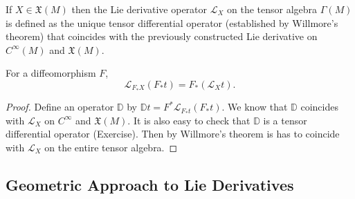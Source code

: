 \documentclass[english,letterpaper]{article}%
\numberwithin{equation}{section}
\numberwithin{figure}{section}
\numberwithin{table}{section}
\theoremstyle{definition}
\theoremstyle{definition}
\theoremstyle{definition}
\theoremstyle{plain}
\theoremstyle{plain}
\theoremstyle{plain}
\theoremstyle{plain}
\theoremstyle{remark}
\theoremstyle{remark}
\def\red{\color{red}}
\newcommand{\Lie}{\mathcal{L}}
\newcommand{\fX}{\mathfrak{X}}
\newcommand{\PRLsep}{   %
           \noindent\makebox[\linewidth]{
                \resizebox{0.5\linewidth}{1pt}{$\blacklozenge$}}}
\begin{document}
\begin{defn}
If $X\in\fX(M)$ then the Lie derivative operator $\Lie_X$ on the tensor algebra $\Gamma(M)$ is defined as the unique tensor differential operator (established by Willmore's theorem) that coincides with the previously constructed Lie derivative on $C^\infty(M)$ and $\fX(M)$.
\end{defn}

\begin{prop}\label{pullbacks of Lie derivatives}
For a diffeomorphism $F$, 
\[\Lie_{F_\ast X}(F_\ast t)=F_\ast (\Lie_X t).\]
\end{prop}
\begin{proof}
Define an operator $\mathbb{D}$ by $\mathbb{D}t=F^\ast \Lie_{F_\ast t}(F_\ast t)$. We know that $\mathbb{D}$ coincides with $\Lie_X$ on $C^\infty$ and $\fX(M)$. It is also easy to check that $\mathbb{D}$ is a tensor differential operator (Exercise). Then by Willmore's theorem is has to coincide with $\Lie_X$ on the entire tensor algebra.
\end{proof}

\subsection{Geometric Approach to Lie Derivatives}
\end{document}
